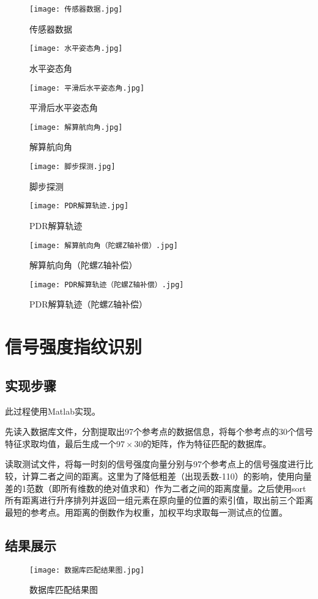 \documentclass{ctexart}
\begin{document}
\begin{figure}[H]
\texttt{[image: 传感器数据.jpg]}
\caption{传感器数据}
\end{figure}
\begin{figure}[H]
\texttt{[image: 水平姿态角.jpg]}
\caption{水平姿态角}
\end{figure}
\begin{figure}[H]
\texttt{[image: 平滑后水平姿态角.jpg]}
\caption{平滑后水平姿态角}
\end{figure}
\begin{figure}[H]
\texttt{[image: 解算航向角.jpg]}
\caption{解算航向角}
\end{figure}
\begin{figure}[H]
\texttt{[image: 脚步探测.jpg]}
\caption{脚步探测}
\end{figure}
\begin{figure}[H]
\texttt{[image: PDR解算轨迹.jpg]}
\caption{PDR解算轨迹}
\end{figure}
\begin{figure}[H]
\texttt{[image: 解算航向角（陀螺Z轴补偿）.jpg]}
\caption{解算航向角（陀螺Z轴补偿）}
\end{figure}
\begin{figure}[H]
\texttt{[image: PDR解算轨迹（陀螺Z轴补偿）.jpg]}
\caption{PDR解算轨迹（陀螺Z轴补偿）}
\end{figure}

\section{信号强度指纹识别}
\subsection{实现步骤}

此过程使用Matlab实现。

先读入数据库文件，分割提取出97个参考点的数据信息，将每个参考点的30个信号特征求取均值，最后生成一个$97\times30$的矩阵，作为特征匹配的数据库。

读取测试文件，将每一时刻的信号强度向量分别与97个参考点上的信号强度进行比较，计算二者之间的距离。这里为了降低粗差（出现丢数-110）的影响，使用向量差的1范数（即所有维数的绝对值求和）作为二者之间的距离度量。之后使用sort所有距离进行升序排列并返回一组元素在原向量的位置的索引值，取出前三个距离最短的参考点。用距离的倒数作为权重，加权平均求取每一测试点的位置。
\subsection{结果展示}

\begin{figure}[H]
\texttt{[image: 数据库匹配结果图.jpg]}
\caption{数据库匹配结果图}
\end{figure}
\end{document}

